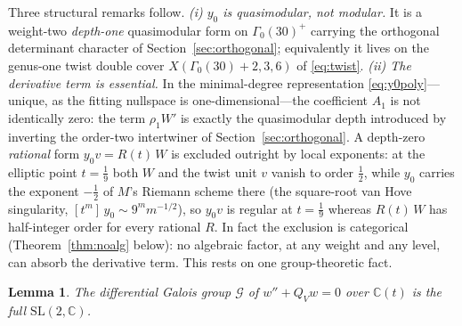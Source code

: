 \documentclass[cntp]{ipart}
\theoremstyle{plain}
\newtheorem{lem}[thm]{Lemma}
\theoremstyle{remark}
\begin{document}
Three structural remarks follow. \emph{(i) $y_0$ is quasimodular, not modular.} It is a
weight-two \emph{depth-one} quasimodular form on $\Gamma_0(30)^+$ carrying the orthogonal
determinant character of Section~\ref{sec:orthogonal}; equivalently it lives on the genus-one twist
double cover $X(\Gamma_0(30){+}2,3,6)$ of \eqref{eq:twist}. \emph{(ii) The derivative term is
essential.} In the minimal-degree representation \eqref{eq:y0poly}---unique, as the fitting
nullspace is one-dimensional---the coefficient $A_1$ is not identically zero: the term
$\rho_1W'$ is exactly the quasimodular depth introduced by inverting the order-two intertwiner
of Section~\ref{sec:orthogonal}. A depth-zero \emph{rational} form $y_0v=R(t)\,W$ is excluded
outright by local exponents: at the elliptic point $t=\tfrac19$ both $W$ and the twist unit $v$
vanish to order $\tfrac12$, while $y_0$ carries the exponent $-\tfrac12$ of $M$'s Riemann scheme
there (the square-root van Hove singularity, $[t^m]\,y_0\sim9^m m^{-1/2}$), so $y_0v$ is regular
at $t=\tfrac19$ whereas $R(t)\,W$ has half-integer order for every rational $R$. In fact the exclusion is categorical
(Theorem~\ref{thm:noalg} below): no
algebraic factor, at any weight and any level, can absorb the derivative term. This rests on
one group-theoretic fact.

\begin{lem}\label{lem:sl2}
The differential Galois group $\mathcal{G}$ of $w''+Q_Vw=0$ over
$\mathbb{C}(t)$ is the full $\mathrm{SL}(2,\mathbb{C})$.
\end{lem}
\end{document}
